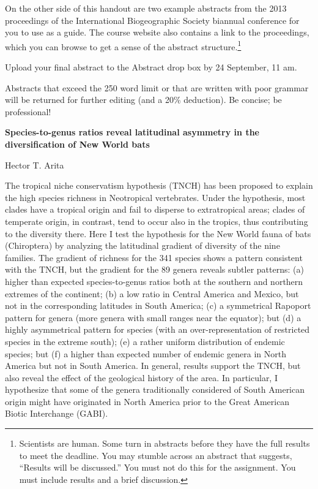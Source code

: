 \documentclass[11pt]{article}
\begin{document}
On the other side of this handout are two example abstracts from the
2013 proceedings of the International Biogeographic Society biannual
conference for you to use as a guide. The course website also contains a
link to the proceedings, which you can browse to get a sense of the
abstract structure.\footnote{Scientists are human. Some turn in abstracts
  before they have the full results to meet the deadline. You may
  stumble across an abstract that suggests, ``Results will be
  discussed.'' You must not do this for the assignment. You must include
  results and a brief discussion.}

Upload your final abstract to the Abstract drop box by 24 September, 11 am.

Abstracts that exceed the 250 word limit or that are written with poor
grammar will be returned for further editing (and a 20\% deduction). Be
concise; be professional!

\newpage

\textbf{Species-to-genus ratios reveal latitudinal asymmetry in the
diversification of New World bats}

Hector T. Arita

The tropical niche conservatism hypothesis (TNCH) has been proposed to
explain the high species richness in Neotropical vertebrates. Under the
hypothesis, most clades have a tropical origin and fail to disperse to
extratropical areas; clades of temperate origin, in contrast, tend to
occur also in the tropics, thus contributing to the diversity there.
Here I test the hypothesis for the New World fauna of bats (Chiroptera)
by analyzing the latitudinal gradient of diversity of the nine families.
The gradient of richness for the 341 species shows a pattern consistent
with the TNCH, but the gradient for the 89 genera reveals subtler
patterns: (a) higher than expected species-to-genus ratios both at the
southern and northern extremes of the continent; (b) a low ratio in
Central America and Mexico, but not in the corresponding latitudes in
South America; (c) a symmetrical Rapoport pattern for genera (more
genera with small ranges near the equator); but (d) a highly
asymmetrical pattern for species (with an over-representation of
restricted species in the extreme south); (e) a rather uniform
distribution of endemic species; but (f) a higher than expected number
of endemic genera in North America but not in South America. In general,
results support the TNCH, but also reveal the effect of the geological
history of the area. In particular, I hypothesize that some of the
genera traditionally considered of South American origin might have
originated in North America prior to the Great American Biotic
Interchange (GABI).
\end{document}
